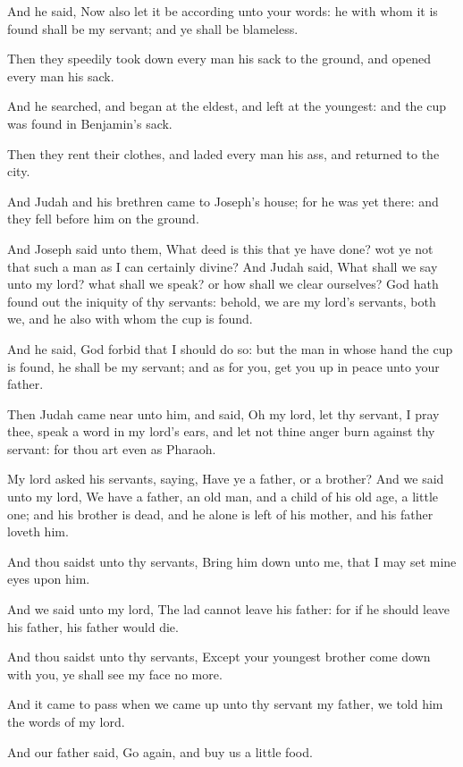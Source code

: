 \verse And he said, Now also let it be according unto your words: he with whom it is found shall be my servant; and ye shall be blameless.

\verse Then they speedily took down every man his sack to the ground, and opened every man his sack.

\verse And he searched, and began at the eldest, and left at the youngest: and the cup was found in Benjamin's sack.

\verse Then they rent their clothes, and laded every man his ass, and returned to the city.

\verse And Judah and his brethren came to Joseph's house; for he was yet there: and they fell before him on the ground.

\verse And Joseph said unto them, What deed is this that ye have done?  wot ye not that such a man as I can certainly divine?  \verse And Judah said, What shall we say unto my lord? what shall we speak?  or how shall we clear ourselves? God hath found out the iniquity of thy servants: behold, we are my lord's servants, both we, and he also with whom the cup is found.

\verse And he said, God forbid that I should do so: but the man in whose hand the cup is found, he shall be my servant; and as for you, get you up in peace unto your father.

\verse Then Judah came near unto him, and said, Oh my lord, let thy servant, I pray thee, speak a word in my lord's ears, and let not thine anger burn against thy servant: for thou art even as Pharaoh.

\verse My lord asked his servants, saying, Have ye a father, or a brother?  \verse And we said unto my lord, We have a father, an old man, and a child of his old age, a little one; and his brother is dead, and he alone is left of his mother, and his father loveth him.

\verse And thou saidst unto thy servants, Bring him down unto me, that I may set mine eyes upon him.

\verse And we said unto my lord, The lad cannot leave his father: for if he should leave his father, his father would die.

\verse And thou saidst unto thy servants, Except your youngest brother come down with you, ye shall see my face no more.

\verse And it came to pass when we came up unto thy servant my father, we told him the words of my lord.

\verse And our father said, Go again, and buy us a little food.

